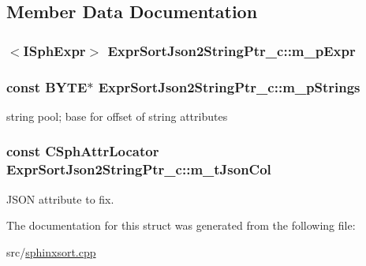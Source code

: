 \subsection{Member Data Documentation}
\hypertarget{structExprSortJson2StringPtr__c_a690a88f8b8a913a19cc3b3655e4f1b05}{
\subsubsection[{m\-\_\-p\-Expr}]{$<${\bf I\-Sph\-Expr}$>$ Expr\-Sort\-Json2\-String\-Ptr\-\_\-c\-::m\-\_\-p\-Expr}}\label{structExprSortJson2StringPtr__c_a690a88f8b8a913a19cc3b3655e4f1b05}
\hypertarget{structExprSortJson2StringPtr__c_a9f58874be98f4356bde7f7004d25d0fe}{
\subsubsection[{m\-\_\-p\-Strings}]{\setlength{\rightskip}{0pt plus 5cm}const {\bf B\-Y\-T\-E}$\ast$ Expr\-Sort\-Json2\-String\-Ptr\-\_\-c\-::m\-\_\-p\-Strings}}\label{structExprSortJson2StringPtr__c_a9f58874be98f4356bde7f7004d25d0fe}


string pool; base for offset of string attributes 

\hypertarget{structExprSortJson2StringPtr__c_a809c4465abae3f5e08b47f77aec27bbe}{
\subsubsection[{m\-\_\-t\-Json\-Col}]{\setlength{\rightskip}{0pt plus 5cm}const {\bf C\-Sph\-Attr\-Locator} Expr\-Sort\-Json2\-String\-Ptr\-\_\-c\-::m\-\_\-t\-Json\-Col}}\label{structExprSortJson2StringPtr__c_a809c4465abae3f5e08b47f77aec27bbe}


J\-S\-O\-N attribute to fix. 



The documentation for this struct was generated from the following file\-:\begin{DoxyCompactItemize}
\item 
src/\hyperlink{sphinxsort_8cpp}{sphinxsort.\-cpp}\end{DoxyCompactItemize}
